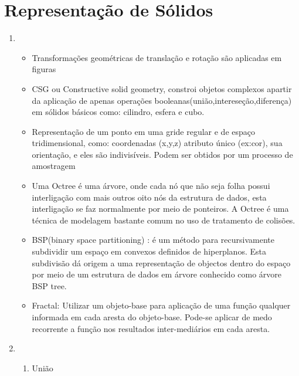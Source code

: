 \section*{Representação de Sólidos}

	\begin{enumerate}[label=\arabic*)]
	\addtocounter{enumi}{3}
		\item 

		\begin{itemize}
		\item 
		Transformações geométricas de translação e rotação são aplicadas
		em figuras
		
		\item 
		CSG ou Constructive solid geometry, constroi objetos complexos apartir da aplicação de
		 apenas operações booleanas(união,intereseção,diferença) em sólidos básicos
		 como: cilindro, esfera e cubo.
		 
		\item 
		Representação de um ponto em uma gride regular e de espaço tridimensional, como: 
		coordenadas (x,y,z) atributo único (ex:cor), sua orientação, e eles são indivisíveis. Podem
		ser obtidos por um processo de amostragem
		
		\item 
       Uma Octree é uma árvore, onde cada nó que não seja folha possui interligação com mais  
        outros oito nós da estrutura de dados, esta interligação se faz normalmente por meio de
         ponteiros. A Octree é uma técnica de modelagem bastante comum no uso de 	         
          tratamento de colisões. 
          
		\item 
		BSP(binary space partitioning) : é um método para recursivamente subdividir um espaço em    
		 convexos definidos de hiperplanos. Esta subdivisão dá origem a uma representação de
		 objectos dentro do espaço por meio de um estrutura de dados em árvore conhecido como
		 árvore BSP tree. 
		 
		\item 
		
		Fractal: Utilizar um objeto-base para aplicação de uma função
		qualquer informada em cada aresta do objeto-base.
		Pode-se aplicar de medo recorrente a função nos 
		resultados inter-mediários em cada aresta.
		\end{itemize}		
		
		\item 

		\begin{enumerate}[label=\alph*)]
			\item União		
		

\end{enumerate}
\end{enumerate}
